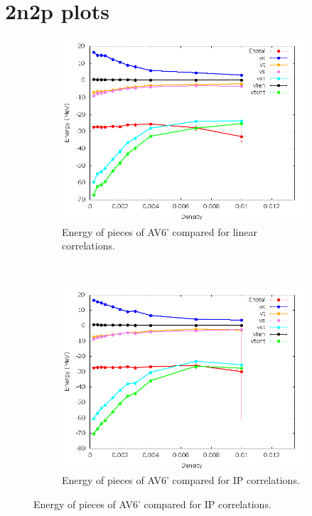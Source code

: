 \documentclass[12pt]{article}
\begin{document}
\section{2n2p plots}
\begin{figure}[h!]
   \centering
   \begin{subfigure}{0.49\textwidth}
      \includegraphics[width=\textwidth]{../av6_2n2p_lin.png}
      \caption{Energy of pieces of AV6' compared for linear correlations.}
   \end{subfigure}
   ~
   \begin{subfigure}{0.49\textwidth}
      \includegraphics[width=\textwidth]{../av6_2n2p_ip.png}
      \caption{Energy of pieces of AV6' compared for IP correlations.}

\end{subfigure}
\end{figure}
\end{document}

